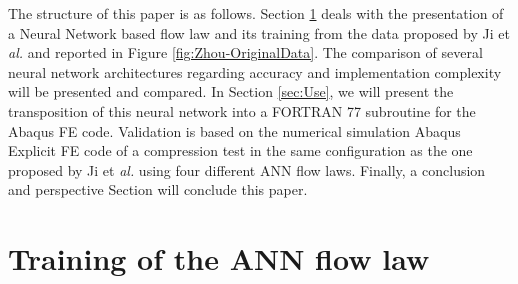 \documentclass[algorithms,article,submit,pdftex,moreauthors]{Definitions/mdpi}
\makeatletter
\DeclareRobustCommand{\eal}{et \emph{al.}\@\xspace}
\makeatother
\begin{document}
The structure of this paper is as follows.
Section \ref{sec:Training} deals with the presentation of a Neural Network based flow law and its training from the data proposed by Ji \eal \cite{Ji-2018} and reported in Figure \ref{fig:Zhou-OriginalData}.
The comparison of several neural network architectures regarding accuracy and implementation complexity will be presented and compared.
In Section \ref{sec:Use}, we will present the transposition of this neural network into a FORTRAN 77 subroutine for the Abaqus FE code.
Validation is based on the numerical simulation Abaqus Explicit FE code of a compression test in the same configuration as the one proposed by Ji \eal \cite{Ji-2018} using four different ANN flow laws.
Finally, a conclusion and perspective Section will conclude this paper.

\section{Training of the ANN flow law}\label{sec:Training}
\end{document}

